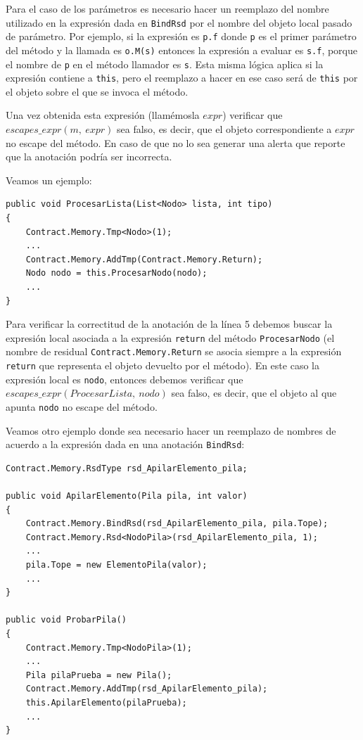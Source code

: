 \documentclass[12pt,a4paper]{article}
\newcommand\mono[1]{\texttt{#1}}
\begin{document}
			Para el caso de los parámetros es necesario hacer un reemplazo del nombre utilizado en la expresión dada en \mono{BindRsd} por el nombre del objeto local pasado de parámetro. Por ejemplo, si la expresión es \mono{p.f} donde \mono{p} es el primer parámetro del método y la llamada es \mono{o.M(s)} entonces la expresión a evaluar es \mono{s.f}, porque el nombre de \mono{p} en el método llamador es \mono{s}. Esta misma lógica aplica si la expresión contiene a \mono{this}, pero el reemplazo a hacer en ese caso será de \mono{this} por el objeto sobre el que se invoca el método.

			Una vez obtenida esta expresión (llamémosla $expr$) verificar que $escapes\_expr(m,\ expr)$ sea falso, es decir, que el objeto correspondiente a $expr$ no escape del método. En caso de que no lo sea generar una alerta que reporte que la anotación podría ser incorrecta.

			\noindent Veamos un ejemplo:
			\vspace{5pt}
			\begin{footnotesize}
			\begin{lstlisting}[caption=Ejemplo de verificación de \mono{AddTmp}]
public void ProcesarLista(List<Nodo> lista, int tipo)
{
	Contract.Memory.Tmp<Nodo>(1);
	...
	Contract.Memory.AddTmp(Contract.Memory.Return);
	Nodo nodo = this.ProcesarNodo(nodo);
	...
}
			\end{lstlisting}
			\end{footnotesize}

			Para verificar la correctitud de la anotación de la línea 5 debemos buscar la expresión local asociada a la expresión \mono{return} del método \mono{ProcesarNodo} (el nombre de residual \mono{Contract.Memory.Return} se asocia siempre a la expresión \mono{return} que representa el objeto devuelto por el método). En este caso la expresión local es \mono{nodo}, entonces debemos verificar que $escapes\_expr(ProcesarLista,\ nodo)$ sea falso, es decir, que el objeto al que apunta \mono{nodo} no escape del método.

			Veamos otro ejemplo donde sea necesario hacer un reemplazo de nombres de acuerdo a la expresión dada en una anotación \mono{BindRsd}:

			\vspace{5pt}
			\begin{footnotesize}
			\begin{lstlisting}[caption=Ejemplo de verificación de \mono{AddTmp}]
Contract.Memory.RsdType rsd_ApilarElemento_pila;

public void ApilarElemento(Pila pila, int valor)
{
	Contract.Memory.BindRsd(rsd_ApilarElemento_pila, pila.Tope);
	Contract.Memory.Rsd<NodoPila>(rsd_ApilarElemento_pila, 1);
	...
	pila.Tope = new ElementoPila(valor);
	...
}

public void ProbarPila()
{
	Contract.Memory.Tmp<NodoPila>(1);
	...
	Pila pilaPrueba = new Pila();
	Contract.Memory.AddTmp(rsd_ApilarElemento_pila);
	this.ApilarElemento(pilaPrueba);
	...
}
			\end{lstlisting}
			\end{footnotesize}
\end{document}

